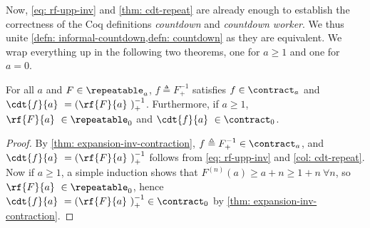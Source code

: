 Now, \eqref{eq: rf-upp-inv} and \cref{thm: cdt-repeat} are already enough to establish the correctness of the Coq definitions \emph{countdown} and \emph{countdown worker}. We thus unite \cref{defn: informal-countdown,defn: countdown} as they are equivalent. We wrap everything up in the following two theorems, one for $a\ge 1$ and one for $a = 0$.
\begin{thm} \label{thm: cdt-inv-rf}
	For all $a$ and $F\in \repeatable_a$, $f\triangleq F^{-1}_+$ satisfies $f \in \contract_{a}$ and $\displaystyle \cdt{f}{a} \ = \left(\rf{F}{a}\ \right)^{-1}_+$. Furthermore, if $a\ge 1$, $\rf{F}{a}\ \in \repeatable_0$ and $\cdt{f}{a}\ \in \contract_0$.
\end{thm}
\begin{proof}
	By \cref{thm: expansion-inv-contraction}, $f\triangleq F^{-1}_+ \in \contract_a$, and $\cdt{f}{a}\ = \left(\rf{F}{a}\ \right)^{-1}_+$ follows from \eqref{eq: rf-upp-inv} and \cref{col: cdt-repeat}.
	Now if $a\ge 1$, a simple induction shows that $F^{(n)}(a)\ge a + n\ge 1 + n \ \forall n$, so $\rf{F}{a}\ \in \repeatable_0$, hence $\cdt{f}{a} \ = \left(\rf{F}{a}\ \right)^{-1}_+ \in \contract_0$ by \cref{thm: expansion-inv-contraction}.
\end{proof}

